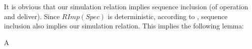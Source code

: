 It is obvious that our simulation relation implies sequence inclusion (of operation and deliver). Since $RImp(Spec)$ is deterministic, according to \cite{Abadi:1991,Lynch:1995}, sequence inclusion also implies our simulation relation. This implies the following lemma:

\begin{lemma}
\label{lemma:equivalence of our simulation relation and sequence inclusion}
A
\end{lemma}




